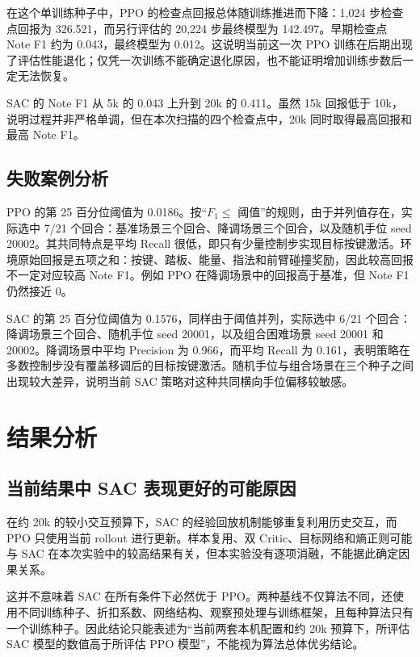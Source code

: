 \documentclass[UTF8,a4paper,11pt]{ctexart}
\begin{document}
在这个单训练种子中，PPO 的检查点回报总体随训练推进而下降：1,024 步检查点回报为 326.521，而另行评估的 20,224 步最终模型为 142.497。早期检查点 Note F1 约为 0.043，最终模型为 0.012。这说明当前这一次 PPO 训练在后期出现了评估性能退化；仅凭一次训练不能确定退化原因，也不能证明增加训练步数后一定无法恢复。

SAC 的 Note F1 从 5k 的 0.043 上升到 20k 的 0.411。虽然 15k 回报低于 10k，说明过程并非严格单调，但在本次扫描的四个检查点中，20k 同时取得最高回报和最高 Note F1。

\subsection{失败案例分析}

PPO 的第 25 百分位阈值为 0.0186。按“$F_1\leq$ 阈值”的规则，由于并列值存在，实际选中 7/21 个回合：基准场景三个回合、降调场景三个回合，以及随机手位 seed 20002。其共同特点是平均 Recall 很低，即只有少量控制步实现目标按键激活。环境原始回报是五项之和：按键、踏板、能量、指法和前臂碰撞奖励，因此较高回报不一定对应较高 Note F1。例如 PPO 在降调场景中的回报高于基准，但 Note F1 仍然接近 0。

SAC 的第 25 百分位阈值为 0.1576，同样由于阈值并列，实际选中 6/21 个回合：降调场景三个回合、随机手位 seed 20001，以及组合困难场景 seed 20001 和 20002。降调场景中平均 Precision 为 0.966，而平均 Recall 为 0.161，表明策略在多数控制步没有覆盖移调后的目标按键激活。随机手位与组合场景在三个种子之间出现较大差异，说明当前 SAC 策略对这种共同横向手位偏移较敏感。

\section{结果分析}

\subsection{当前结果中 SAC 表现更好的可能原因}

在约 20k 的较小交互预算下，SAC 的经验回放机制能够重复利用历史交互，而 PPO 只使用当前 rollout 进行更新。样本复用、双 Critic、目标网络和熵正则可能与 SAC 在本次实验中的较高结果有关，但本实验没有逐项消融，不能据此确定因果关系。

这并不意味着 SAC 在所有条件下必然优于 PPO。两种基线不仅算法不同，还使用不同训练种子、折扣系数、网络结构、观察预处理与训练框架，且每种算法只有一个训练种子。因此结论只能表述为“当前两套本机配置和约 20k 预算下，所评估 SAC 模型的数值高于所评估 PPO 模型”，不能视为算法总体优劣结论。
\end{document}
